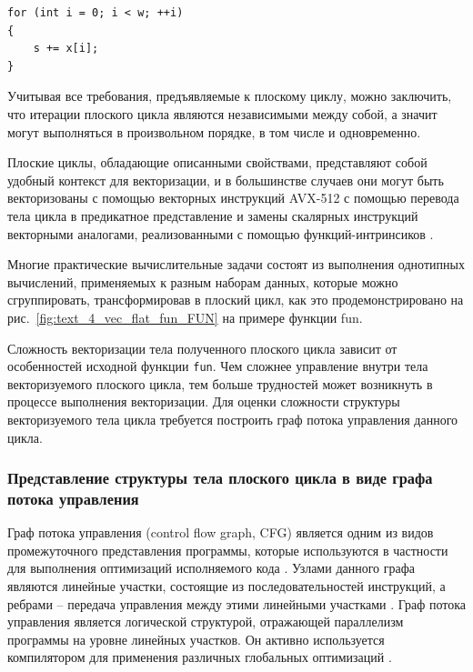 \begin{lstlisting}[caption={Пример цикла с межитерационной зависимостью.},label={lst:text_4_vec_not_flat}]
for (int i = 0; i < w; ++i)
{
   	s += x[i];
}
\end{lstlisting}

Учитывая все требования, предъявляемые к плоскому циклу, можно заключить, что итерации плоского цикла являются независимыми между собой, а значит могут выполняться в произвольном порядке, в том числе и одновременно.

Плоские циклы, обладающие описанными свойствами, представляют собой удобный контекст для векторизации, и в большинстве случаев они могут быть векторизованы с помощью векторных инструкций AVX-512 с помощью перевода тела цикла в предикатное представление и замены скалярных инструкций векторными аналогами, реализованными с помощью функций-интринсиков \cite{Savin2020VecFlat,IntelIntrinsicsGuide}.

Многие практические вычислительные задачи состоят из выполнения однотипных вычислений, применяемых к разным наборам данных, которые можно сгруппировать, трансформировав в плоский цикл, как это продемонстрировано на рис.~\ref{fig:text_4_vec_flat_fun_FUN} на примере функции fun.

Сложность векторизации тела полученного плоского цикла зависит от особенностей исходной функции \texttt{fun}.
Чем сложнее управление внутри тела векторизуемого плоского цикла, тем больше трудностей может возникнуть в процессе выполнения векторизации.
Для оценки сложности структуры векторизуемого тела цикла требуется построить граф потока управления данного цикла.

\subsubsection{Представление структуры тела плоского цикла в виде графа потока управления}

Граф потока управления (control flow graph, CFG) является одним из видов промежуточного представления программы, которые используются в частности для выполнения оптимизаций исполняемого кода \cite{Muchnick1997Compilers}.
Узлами данного графа являются линейные участки, состоящие из последовательностей инструкций, а ребрами -- передача управления между этими линейными участками \cite{Rybakov2013CGF}.
Граф потока управления является логической структурой, отражающей параллелизм программы на уровне линейных участков.
Он активно используется компилятором для применения различных глобальных оптимизаций \cite{Aho2006Compilers}.


